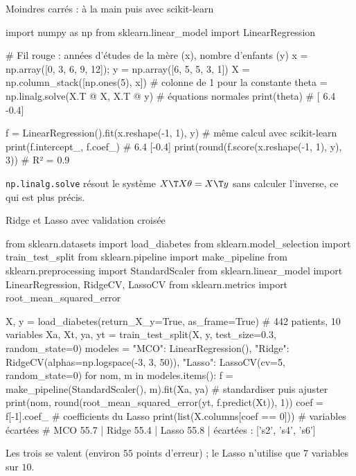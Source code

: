 \documentclass[aspectratio=169,11pt]{beamer}
\begin{document}
\begin{frame}[fragile]{Moindres carrés : à la main puis avec scikit-learn}
\begin{python}
import numpy as np
from sklearn.linear_model import LinearRegression

# Fil rouge : années d'études de la mère (x), nombre d'enfants (y)
x = np.array([0, 3, 6, 9, 12]); y = np.array([6, 5, 5, 3, 1])
X = np.column_stack([np.ones(5), x])            # colonne de 1 pour la constante
theta = np.linalg.solve(X.T @ X, X.T @ y)       # équations normales
print(theta)                                    # [ 6.4 -0.4]

f = LinearRegression().fit(x.reshape(-1, 1), y) # même calcul avec scikit-learn
print(f.intercept_, f.coef_)                    # 6.4 [-0.4]
print(round(f.score(x.reshape(-1, 1), y), 3))   # R² = 0.9
\end{python}
\vskip-1mm
{\small\color{cnfGris}\texttt{np.linalg.solve} résout le système $X\T X\theta=X\T y$ sans calculer l'inverse, ce qui est plus précis.}
\end{frame}

\begin{frame}[fragile]{Ridge et Lasso avec validation croisée}
\begin{python}[basicstyle=\ttfamily\scriptsize]
from sklearn.datasets import load_diabetes
from sklearn.model_selection import train_test_split
from sklearn.pipeline import make_pipeline
from sklearn.preprocessing import StandardScaler
from sklearn.linear_model import LinearRegression, RidgeCV, LassoCV
from sklearn.metrics import root_mean_squared_error

X, y = load_diabetes(return_X_y=True, as_frame=True)   # 442 patients, 10 variables
Xa, Xt, ya, yt = train_test_split(X, y, test_size=0.3, random_state=0)
modeles = {"MCO": LinearRegression(),
           "Ridge": RidgeCV(alphas=np.logspace(-3, 3, 50)),
           "Lasso": LassoCV(cv=5, random_state=0)}
for nom, m in modeles.items():
    f = make_pipeline(StandardScaler(), m).fit(Xa, ya)  # standardiser puis ajuster
    print(nom, round(root_mean_squared_error(yt, f.predict(Xt)), 1))
coef = f[-1].coef_                                       # coefficients du Lasso
print(list(X.columns[coef == 0]))                        # variables écartées
# MCO 55.7 | Ridge 55.4 | Lasso 55.8 | écartées : ['s2', 's4', 's6']
\end{python}
\vskip-1mm
{\small\color{cnfGris}Les trois se valent (environ $55$ points d'erreur) ; le Lasso n'utilise que $7$ variables sur $10$.}
\end{frame}
\end{document}
